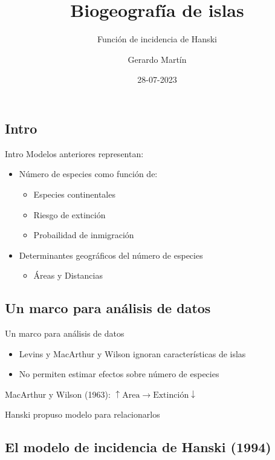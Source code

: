 \documentclass[
  11pt,
  ignorenonframetext,
]{beamer}
\title{Biogeografía de islas}
\subtitle{Función de incidencia de Hanski}
\author{Gerardo Martín}
\date{28-07-2023}
\providecommand{\tightlist}{%
  \setlength{\itemsep}{0pt}\setlength{\parskip}{0pt}}
\begin{document}
\frame{\titlepage}

\hypertarget{intro}{%
\subsection{Intro}\label{intro}}

\begin{frame}{Intro}
Modelos anteriores representan:

\begin{itemize}
\item
  Número de especies como función de:

  \begin{itemize}
  \item
    Especies continentales
  \item
    Riesgo de extinción
  \item
    Probailidad de inmigración
  \end{itemize}
\item
  Determinantes geográficos del número de especies

  \begin{itemize}
  \tightlist
  \item
    Áreas y Distancias
  \end{itemize}
\end{itemize}
\end{frame}

\hypertarget{un-marco-para-anuxe1lisis-de-datos}{%
\subsection{Un marco para análisis de
datos}\label{un-marco-para-anuxe1lisis-de-datos}}

\begin{frame}{Un marco para análisis de datos}
\begin{itemize}
\item
  Levins y MacArthur y Wilson ignoran características de islas
\item
  No permiten estimar efectos sobre número de especies
\end{itemize}

MacArthur y Wilson (1963):
\(\uparrow \mathrm{Area} \rightarrow \mathrm{Extinción} \downarrow\)

Hanski propuso modelo para relacionarlos
\end{frame}

\hypertarget{el-modelo-de-incidencia-de-hanski-1994}{%
\subsection{El modelo de incidencia de Hanski
(1994)}\label{el-modelo-de-incidencia-de-hanski-1994}}
\end{document}
